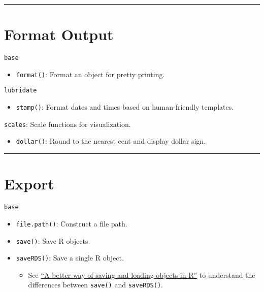 \documentclass[]{book}
\providecommand{\tightlist}{%
  \setlength{\itemsep}{0pt}\setlength{\parskip}{0pt}}
\theoremstyle{definition}
\theoremstyle{definition}
\theoremstyle{definition}
\theoremstyle{remark}
\begin{document}
\begin{center}\rule{0.5\linewidth}{\linethickness}\end{center}

\section{Format Output}\label{format-output}

\texttt{base}

\begin{itemize}
\tightlist
\item
  \texttt{format()}: Format an object for pretty printing.
\end{itemize}

\texttt{lubridate}

\begin{itemize}
\tightlist
\item
  \texttt{stamp()}: Format dates and times based on human-friendly
  templates.
\end{itemize}

\texttt{scales}: Scale functions for visualization.

\begin{itemize}
\tightlist
\item
  \texttt{dollar()}: Round to the nearest cent and display dollar sign.
\end{itemize}

\begin{center}\rule{0.5\linewidth}{\linethickness}\end{center}

\section{Export}\label{export}

\texttt{base}

\begin{itemize}
\tightlist
\item
  \texttt{file.path()}: Construct a file path.
\item
  \texttt{save()}: Save R objects.
\item
  \texttt{saveRDS()}: Save a single R object.

  \begin{itemize}
  \tightlist
  \item
    See
    \href{https://www.fromthebottomoftheheap.net/2012/04/01/saving-and-loading-r-objects/}{``A
    better way of saving and loading objects in R''} to understand the
    differences between \texttt{save()} and \texttt{saveRDS()}.
  \end{itemize}
\end{itemize}
\end{document}
